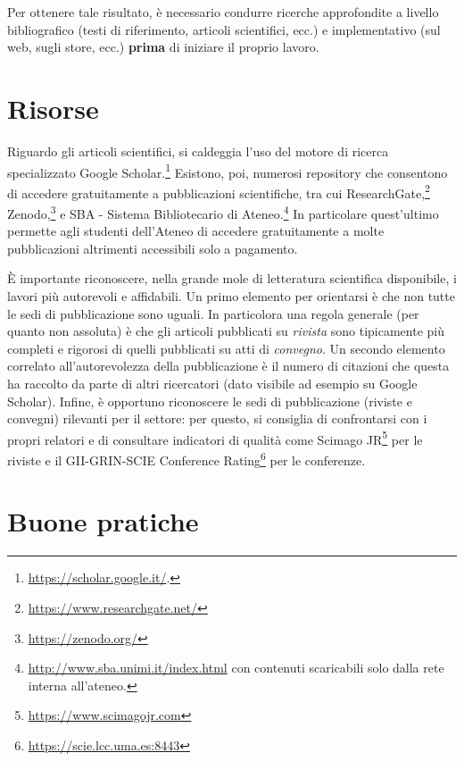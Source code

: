 \documentclass[12pt]{report}
\begin{document}
    Per ottenere tale risultato, è necessario condurre ricerche approfondite a livello bibliografico (testi di riferimento, articoli scientifici, ecc.) e implementativo (sul web, sugli store, ecc.) \textbf{prima} di iniziare il proprio lavoro.


    \section{Risorse}

    Riguardo gli articoli scientifici, si caldeggia l'uso del motore di ricerca specializzato Google Scholar.\footnote{\url{https://scholar.google.it/}.} Esistono, poi, numerosi repository che consentono di accedere gratuitamente a pubblicazioni scientifiche, tra cui ResearchGate,\footnote{\url{https://www.researchgate.net/}} Zenodo,\footnote{\url{https://zenodo.org/}} e SBA - Sistema Bibliotecario di Ateneo.\footnote{\url{http://www.sba.unimi.it/index.html} con contenuti scaricabili solo dalla rete interna all'ateneo.} In particolare quest'ultimo permette agli studenti dell'Ateneo di accedere gratuitamente a molte pubblicazioni altrimenti accessibili solo a pagamento.

    \`E importante riconoscere, nella grande mole di letteratura scientifica disponibile, i lavori pi\`u autorevoli e affidabili. Un primo elemento per orientarsi \`e che non tutte le sedi di pubblicazione sono uguali. In particolora una regola generale (per quanto non assoluta) \`e che gli articoli pubblicati su {\em rivista} sono tipicamente pi\`u completi e rigorosi di quelli pubblicati su atti di {\em convegno}. Un secondo elemento correlato all'autorevolezza della pubblicazione \`e il numero di citazioni che questa ha raccolto da parte di altri ricercatori (dato visibile ad esempio su Google Scholar). Infine, \`e opportuno riconoscere le sedi di pubblicazione (riviste e convegni) rilevanti per il settore: per questo, si consiglia di confrontarsi con i propri relatori e di consultare indicatori di qualità come Scimago JR\footnote{\url{https://www.scimagojr.com}} per le riviste e il GII-GRIN-SCIE Conference Rating\footnote{\url{https://scie.lcc.uma.es:8443}} per le conferenze.


    \section{Buone pratiche}
\end{document}
